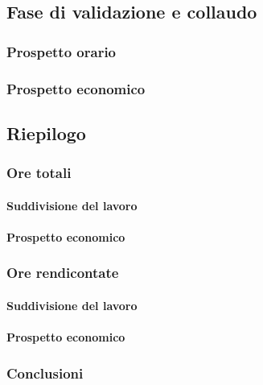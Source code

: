 \subsection{Fase di validazione e collaudo}
\subsubsection{Prospetto orario}
\subsubsection{Prospetto economico}

\subsection{Riepilogo}
\subsubsection{Ore totali}
\paragraph{Suddivisione del lavoro}
\paragraph{Prospetto economico}

\subsubsection{Ore rendicontate}
\paragraph{Suddivisione del lavoro}
\paragraph{Prospetto economico}

\subsubsection{Conclusioni}
